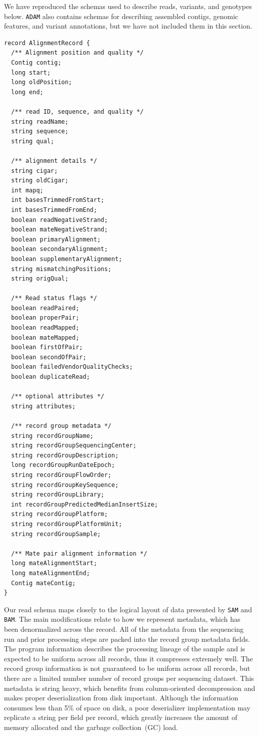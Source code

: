 \documentclass[masters]{ucbthesis}
\begin{document}
We have reproduced the schemas used to describe reads, variants, and genotypes below. \texttt{ADAM} also
contains schemas for describing assembled contigs, genomic features, and variant annotations, but we have
not included them in this section.

\begin{lstlisting}[caption=\texttt{ADAM} read schema]
record AlignmentRecord {
  /** Alignment position and quality */
  Contig contig;
  long start;
  long oldPosition;
  long end;

  /** read ID, sequence, and quality */
  string readName;
  string sequence;
  string qual;
  
  /** alignment details */
  string cigar;
  string oldCigar;
  int mapq;
  int basesTrimmedFromStart;
  int basesTrimmedFromEnd;
  boolean readNegativeStrand;
  boolean mateNegativeStrand;
  boolean primaryAlignment;
  boolean secondaryAlignment;
  boolean supplementaryAlignment;
  string mismatchingPositions;
  string origQual;

  /** Read status flags */
  boolean readPaired;
  boolean properPair;
  boolean readMapped;
  boolean mateMapped;
  boolean firstOfPair;
  boolean secondOfPair;
  boolean failedVendorQualityChecks;
  boolean duplicateRead;

  /** optional attributes */
  string attributes;

  /** record group metadata */
  string recordGroupName;
  string recordGroupSequencingCenter;
  string recordGroupDescription;
  long recordGroupRunDateEpoch;
  string recordGroupFlowOrder;
  string recordGroupKeySequence;
  string recordGroupLibrary;
  int recordGroupPredictedMedianInsertSize;
  string recordGroupPlatform;
  string recordGroupPlatformUnit;
  string recordGroupSample;

  /** Mate pair alignment information */
  long mateAlignmentStart;
  long mateAlignmentEnd;
  Contig mateContig;
}
\end{lstlisting}

Our read schema maps closely to the logical layout of data presented by \texttt{SAM} and \texttt{BAM}.
The main modifications relate to how we represent metadata, which has been denormalized across the record.
All of the metadata from the sequencing run and prior processing steps are packed into the record
group metadata fields. The program information describes the processing lineage of the sample and
is expected to be uniform across all records, thus it compresses extremely well. The record group
information is not guaranteed to be uniform across all records, but there are a limited number number
of record groups per sequencing dataset. This
metadata is string heavy, which benefits from column-oriented decompression and makes proper deserialization from disk important. Although the
information consumes less than 5\% of space on disk, a poor deserializer implementation may replicate
a string per field per record, which greatly increases the amount of memory allocated and the garbage
collection~(GC) load.
\end{document}
